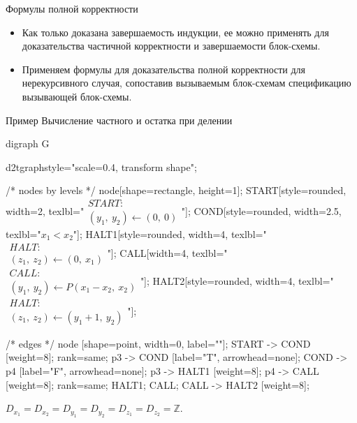 \documentclass[hyperref={unicode=true}]{beamer}
\begin{document}
    \begin{frame}{Формулы полной корректности}
    \begin{itemize}
    \item Как только доказана завершаемость индукции, ее можно применять
    для доказательства частичной корректности и завершаемости блок-схемы.
    \item Применяем формулы для доказательства полной корректности
        для нерекурсивного случая, сопоставив вызываемым блок-схемам
        спецификацию вызывающей блок-схемы.
    \end{itemize}
    \end{frame}

    \begin{frame}[fragile]{Пример}
    Вычисление частного и остатка при делении
	\huge
	\begin{dot2tex}[options=-traw]
	digraph G{
		d2tgraphstyle="scale=0.4, transform shape";

		/* nodes by levels */
		node[shape=rectangle, height=1];
		START[style=rounded, width=2, texlbl="$\begin{matrix}START:\\(y_1,~y_2) \leftarrow (0,~0)\end{matrix}$"];
        COND[style=rounded, width=2.5, texlbl="$x_1 < x_2$"];
		HALT1[style=rounded, width=4, texlbl="$\begin{matrix}HALT:\\(z_1,~z_2) \leftarrow (0,~x_1)\end{matrix}$"];
		CALL[width=4, texlbl="$\begin{matrix}CALL:\\(y_1,~y_2) \leftarrow P(x_1-x_2,~x_2)\end{matrix}$"];
        HALT2[style=rounded, width=4, texlbl="$\begin{matrix}HALT:\\(z_1,~z_2) \leftarrow (y_1+1,~y_2)\end{matrix}$"];

		/* edges */
		node [shape=point, width=0, label=""];
		START -> COND [weight=8];
		{ rank=same; p3 -> COND [label="T", arrowhead=none]; COND -> p4 [label="F", arrowhead=none]; }
		p3 -> HALT1 [weight=8];
		p4 -> CALL [weight=8];
		{ rank=same; HALT1; CALL; }
		CALL -> HALT2 [weight=8];
        }
	\end{dot2tex}

	\normalsize

    $D_{x_1} = D_{x_2} = D_{y_1} = D_{y_2} = D_{z_1} = D_{z_2} = \mathbb{Z}$.
	    \end{frame}
\end{document}
